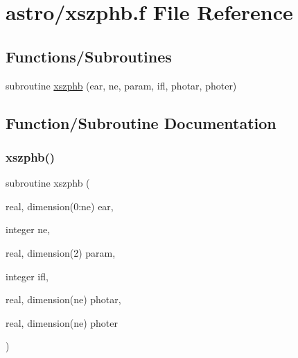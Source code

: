 \hypertarget{xszphb_8f}{}\section{astro/xszphb.f File Reference}
\label{xszphb_8f}
\subsection*{Functions/\+Subroutines}
\begin{DoxyCompactItemize}
\item 
subroutine \hyperlink{xszphb_8f_a143f75be1870b3234901af561801020a}{xszphb} (ear, ne, param, ifl, photar, photer)
\end{DoxyCompactItemize}


\subsection{Function/\+Subroutine Documentation}
\mbox{\label{xszphb_8f_a143f75be1870b3234901af561801020a}} 
\subsubsection{\texorpdfstring{xszphb()}{xszphb()}}
{\footnotesize\ttfamily subroutine xszphb (\begin{DoxyParamCaption}\item[{real, dimension(0\+:ne)}]{ear,  }\item[{integer}]{ne,  }\item[{real, dimension(2)}]{param,  }\item[{integer}]{ifl,  }\item[{real, dimension(ne)}]{photar,  }\item[{real, dimension(ne)}]{photer }\end{DoxyParamCaption})}

